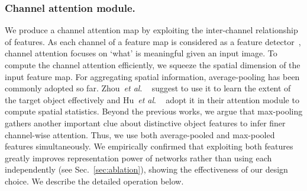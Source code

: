 \documentclass[runningheads]{llncs}
\newcommand{\etal}{\textit{et al}. }
\newcommand{\sref}[1]{Sec.~\ref{#1}}
\begin{document}
\subsubsection{Channel attention module.}
We produce a channel attention map by exploiting the inter-channel relationship of features. 
As each channel of a feature map is considered as a feature detector~\cite{zeiler2014visualizing}, channel attention focuses on `what' is meaningful given an input image. To compute the channel attention efficiently, we squeeze the spatial dimension of the input feature map.
For aggregating spatial information, average-pooling has been commonly adopted so far. Zhou~\etal~\cite{zhou2016learning} suggest to use it to learn the extent of the target object effectively and Hu~\etal~\cite{hu2017squeeze} adopt it in their attention module to compute spatial statistics.
Beyond the previous works, we argue that max-pooling gathers another important clue about distinctive object features to infer finer channel-wise attention. Thus, we use both average-pooled and max-pooled features simultaneously. We empirically confirmed that exploiting both features greatly improves representation power of networks rather than using each independently (see \sref{sec:ablation}), showing the effectiveness of our design choice. 
We describe the detailed operation below. 
\end{document}
